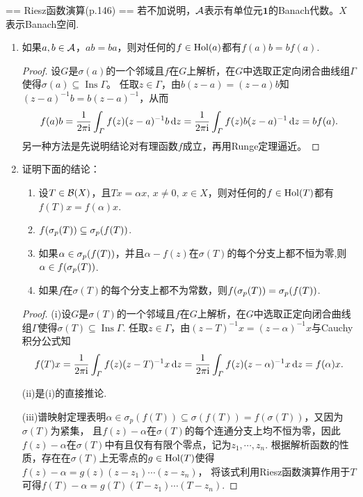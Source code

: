 == Riesz函数演算(p.146) ==
若不加说明，$\mathcal{A}$表示有单位元$\mathbf{1}$的Banach代数。$X$表示Banach空间.
\begin{enumerate}
    \item 如果$a,b\in\mathcal{A}$，$ab=ba$，则对任何的$f\in\mathrm{Hol}(a)$都有$f(a)b=bf(a)$.
    \begin{proof}
        设$G$是$\sigma(a)$的一个邻域且$f$在$G$上解析，在$G$中选取正定向闭合曲线组$\varGamma$使得$\sigma(a)\subseteq\operatorname{Ins}\varGamma$。
        任取$z\in\varGamma$，由$b(z-a)=(z-a)b$知$(z-a)^{-1}b=b(z-a)^{-1}$，从而
        \[f(a)b=\frac{1}{2\pi{\rm i}}\int_\varGamma f(z)(z-a)^{-1}b\,{\rm d}z
        =\frac{1}{2\pi{\rm i}}\int_\varGamma f(z)b(z-a)^{-1}\,{\rm d}z=bf(a).\]
        另一种方法是先说明结论对有理函数$f$成立，再用Runge定理逼近。
    \end{proof}
    \item 证明下面的结论：
    \begin{enumerate}[label=(\roman*)]
        \item 设$T\in\mathcal{B}(X)$，且$Tx=\alpha x,\,x\neq 0,\,x\in X$，则对任何的$f\in\mathrm{Hol}(T)$都有$f(T)x=f(\alpha)x$.
        \item $f(\sigma_{p}(T))\subseteq\sigma_{p}(f(T))$.
        \item 如果$\alpha\in\sigma_{p}(f(T))$，并且$\alpha-f(z)$在$\sigma(T)$的每个分支上都不恒为零,则$\alpha\in f(\sigma_{p}(T))$.
        \item 如果$f$在$\sigma(T)$的每个分支上都不为常数，则$f(\sigma_{p}(T))=\sigma_{p}(f(T))$.
    \end{enumerate}
    \begin{proof}
        (i)设$G$是$\sigma(T)$的一个邻域且$f$在$G$上解析，在$G$中选取正定向闭合曲线组$\varGamma$使得$\sigma(T)\subseteq\operatorname{Ins}\varGamma$.
        任取$z\in\varGamma$，由$(z-T)^{-1}x=(z-\alpha)^{-1}x$与Cauchy积分公式知
        \[f(T)x=\frac{1}{2\pi{\rm i}}\int_\varGamma f(z)(z-T)^{-1}x\,{\rm d}z=\frac{1}{2\pi{\rm i}}\int_\varGamma f(z)(z-\alpha)^{-1}x\,{\rm d}z=f(\alpha)x.\]

        (ii)是(i)的直接推论.

        (iii)谱映射定理表明$\alpha\in\sigma_p(f(T))\subseteq\sigma(f(T))=f(\sigma(T))$，又因为$\sigma(T)$为紧集，
        且$f(z)-\alpha$在$\sigma(T)$的每个连通分支上均不恒为零，因此$f(z)-\alpha$在$\sigma(T)$中有且仅有有限个零点，记为$z_1,\cdots,z_n$.
        根据解析函数的性质，存在在$\sigma(T)$上无零点的$g\in\mathrm{Hol}(T)$使得$f(z)-\alpha=g(z)(z-z_1)\cdots(z-z_n)$，
        将该式利用Riesz函数演算作用于$T$可得$f(T)-\alpha=g(T)(T-z_1)\cdots(T-z_n)$.


\end{proof}
\end{enumerate}
